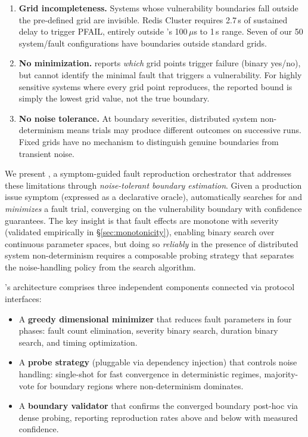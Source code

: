 \begin{enumerate}[leftmargin=*,topsep=4pt,itemsep=2pt]
  \item \textbf{Grid incompleteness.} Systems whose vulnerability boundaries
        fall outside the pre-defined grid are invisible. Redis Cluster requires
        2.7\,s of sustained delay to trigger PFAIL, entirely outside
        \xinda{}'s 100\,$\mu$s to 1\,s range. Seven of our 50 system/fault
        configurations have boundaries outside standard grids.
  \item \textbf{No minimization.} \xinda{} reports \emph{which} grid points
        trigger failure (binary yes/no), but cannot identify the minimal
        fault that triggers a vulnerability. For highly sensitive systems
        where every grid point reproduces, the reported bound is simply the
        lowest grid value, not the true boundary.
  \item \textbf{No noise tolerance.} At boundary severities, distributed
        system non-determinism means trials may produce different outcomes
        on successive runs. Fixed grids have no mechanism to distinguish
        genuine boundaries from transient noise.
\end{enumerate}

We present \system{}, a symptom-guided fault reproduction orchestrator that
addresses these limitations through \emph{noise-tolerant boundary estimation}.
Given a production issue symptom (expressed as a declarative oracle), \system{}
automatically searches for and \emph{minimizes} a fault trial, converging on
the vulnerability boundary with confidence guarantees. The key insight is that
fault effects are monotone with severity (validated empirically in
\S\ref{sec:monotonicity}), enabling binary search over continuous parameter
spaces, but doing so \emph{reliably} in the presence of distributed system
non-determinism requires a composable probing strategy that separates the
noise-handling policy from the search algorithm.

\system{}'s architecture comprises three independent components connected via
protocol interfaces:

\begin{itemize}[leftmargin=*,topsep=2pt,itemsep=1pt]
  \item A \textbf{greedy dimensional minimizer} that reduces fault parameters
        in four phases: fault count elimination, severity binary search,
        duration binary search, and timing optimization.
  \item A \textbf{probe strategy} (pluggable via dependency injection) that
        controls noise handling: single-shot for fast convergence in
        deterministic regimes, majority-vote for boundary regions where
        non-determinism dominates.
  \item A \textbf{boundary validator} that confirms the converged boundary
        post-hoc via dense probing, reporting reproduction rates above
        and below with measured confidence.
\end{itemize}

